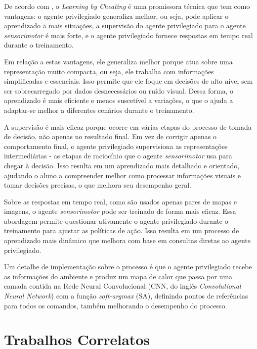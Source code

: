 \documentclass[a4paper,12pt,Times]{article}
\begin{document}
 De acordo com , o \textit{Learning by Cheating} é uma promissora técnica que tem como vantagens: o agente privilegiado generaliza melhor, ou seja, pode aplicar o aprendizado a mais situações, a supervisão do agente privilegiado para o agente \textit{sensorimotor} é mais forte, e o agente privilegiado fornece respostas em tempo real durante o treinamento.
 
 Em relação a estas vantagens, ele generaliza melhor porque atua sobre uma representação muito compacta, ou seja, ele trabalha com informações simplificadas e essenciais. Isso permite que ele foque em decisões de alto nível sem ser sobrecarregado por dados desnecessários ou ruído visual. Dessa forma, o aprendizado é mais eficiente e menos suscetível a variações, o que o ajuda a adaptar-se melhor a diferentes cenários durante o treinamento. 
 
 A supervisão é mais eficaz porque ocorre em várias etapas do processo de tomada de decisão, não apenas no resultado final. Em vez de corrigir apenas o comportamento final, o agente privilegiado supervisiona as representações intermediárias - as etapas de raciocínio que o agente \textit{sensorimotor} usa para chegar à decisão. Isso resulta em um aprendizado mais detalhado e orientado, ajudando o aluno a compreender melhor como processar informações visuais e tomar decisões precisas, o que melhora seu desempenho geral.

 Sobre as respostas em tempo real, como são usados apenas pares de mapas e imagens, o agente \textit{sensorimotor} pode ser treinado de forma mais eficaz. Essa abordagem permite questionar ativamente o agente privilegiado durante o treinamento para ajustar as políticas de ação. Isso resulta em um processo de aprendizado mais dinâmico que melhora com base em consultas diretas ao agente privilegiado.

Um detalhe de implementação sobre o processo é que o agente privilegiado recebe as informações do ambiente e produz um mapa de calor que passa por uma camada contida na Rede Neural Convolucional (CNN, do inglês \textit{Convolutional Neural Network}) com a função \textit{soft-argmax} (SA), definindo pontos de referências para todos os comandos, também melhorando o desempenho do processo.

\section{Trabalhos Correlatos}
\end{document}
